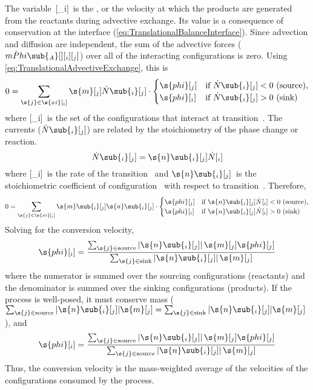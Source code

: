 The variable~[_i]~is the \emph{}, or the velocity at which the products are generated from the reactants during advective exchange.  Its value is a consequence of conservation at the interface (\autoref{eq:TranslationalBalanceInterface}).  Since advection and diffusion are independent, the sum of the advective forces ($\dot{mPhi}\sub{_A}[ ][_i][_j]$) over all of the interacting configurations is zero.  Using \autoref{eq:TranslationalAdvectiveExchange}, this is
\begin{equation}
  0 = \sum_{\s{j} \in \s{xi}[_i]}\s{m}[_j]\dot{N}\sub{_i}[_j]\cdot
  \begin{cases}%
    \s{phi}[_j] & \text{if $\dot{N}\sub{_i}[_j] < 0$ (source),} \\
    \s{phi}[_i] & \text{if $\dot{N}\sub{_i}[_j] > 0$ (sink)}
  \end{cases}
\end{equation}
where [_i]~is the set of the configurations that interact at transition~.  The currents ($\dot{N}\sub{_i}[_j]$) are related by the stoichiometry of the phase change or reaction.
\begin{equation}
  \dot{N}\sub{_i}[_j] = \s{n}\sub{_i}[_j]\dot{N}[_i]
\end{equation}
where [_i]~is the rate of the transition~ and $\s{n}\sub{_i}[_j]$~is the stoichiometric coefficient of configuration~ with respect to transition~.  Therefore,
\begin{equation}
  0 = \sum_{\s{j} \in \s{xi}[_i]}\s{m}\sub{_i}[_j]\s{n}\sub{_i}[_j]\cdot
  \begin{cases}%
    \s{phi}[_j] & \text{if $\s{n}\sub{_i}[_j]\dot{N}[_i] < 0$ (source),} \\
    \s{phi}[_i] & \text{if $\s{n}\sub{_i}[_j]\dot{N}[_i] > 0$ (sink)}
  \end{cases}
\end{equation}
Solving for the conversion velocity,
\begin{equation}
  \label{eq:ConversionVelocity1}
  \s{phi}[_i] = \frac{\sum_{\s{j}\in\text{source}}\left|\s{n}\sub{_i}[_j]\right|\s{m}[_j]\s{phi}[_j]}{\sum_{\s{j}\in\text{sink}}\left|\s{n}\sub{_i}[_j]\right|\s{m}[_j]}
\end{equation}
where the numerator is summed over the sourcing configurations (reactants) and the denominator is summed over the sinking configurations (products).  If the process is well-posed, it must conserve mass ($\sum_{\s{j}\in\text{source}}|\s{n}\sub{_i}[_j]|\s{m}[_j] = \sum_{\s{j}\in\text{sink}}|\s{n}\sub{_i}[_j]|\s{m}[_j]$), and
\begin{equation}
  \label{eq:ConversionVelocity2}
  \s{phi}[_i] = \frac{\sum_{\s{j}\in\text{source}}\left|\s{n}\sub{_i}[_j]\right|\s{m}[_j]\s{phi}[_j]}{\sum_{\s{j}\in\text{source}}\left|\s{n}\sub{_i}[_j]\right|\s{m}[_j]}
\end{equation}
Thus, the conversion velocity is the mass-weighted average of the velocities of the configurations consumed by the process.



